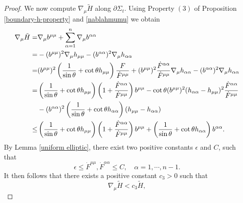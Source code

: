 \documentclass[11pt,reqno]{amsart}
\theoremstyle{definition}
\theoremstyle{remark}
\numberwithin{equation}{section}
\renewcommand{\(}{\left(}
\renewcommand{\)}{\right)}
\renewcommand{\-}{\overline}
\begin{document}
\begin{proof}
We now compute $\nabla_{\mu}\tilde{H}$ along $\partial\Sigma_t$. Using  Property $(3)$ of Proposition \ref{boundary-h-property} and \eqref{nablahmumu} we obtain
\begin{align}
	\nabla_{\mu}{\tilde{H}}=&\nabla_{\mu}{b^{\mu\mu}}+\sum_{\alpha=1}^n{\nabla_{\mu}b^{\alpha\alpha}}\notag\\
	=&-(b^{\mu\mu})^2\nabla_{\mu}{h_{\mu\mu}}-(b^{\alpha\alpha})^2\nabla_{\mu}{h_{\alpha\alpha}}\notag\\
	=&(b^{\mu\mu})^2\left(\frac{1}{\sin\theta}+\cot\theta h_{\mu\mu}\right)\frac{F}{\dot{F}^{\mu\mu}}+(b^{\mu\mu})^2\frac{\dot{F}^{\alpha\alpha}}{\dot{F}^{\mu\mu}}\nabla_{\mu}{h_{\alpha\alpha}}-(b^{\alpha\alpha})^2\nabla_{\mu}{h_{\alpha\alpha}}\nonumber\\
	=&\left(\frac{1}{\sin\theta}+\cot\theta h_{\mu\mu}\right)\left(1+\frac{\dot{F}^{\alpha\alpha}}{\dot{F}^{\mu\mu}}\right)b^{\mu\mu}-\cot\theta(b^{\mu\mu})^2(h_{\alpha\alpha}-h_{\mu\mu})^2\frac{\dot{F}^{\alpha\alpha}}{\dot{F}^{\mu\mu}}\nonumber\\
	&-(b^{\alpha\alpha})^2\left(\frac{1}{\sin\theta}+\cot\theta h_{\alpha\alpha}\right)(h_{\mu\mu}-h_{\alpha\alpha})\nonumber\\
	\leq&\left(\frac{1}{\sin\theta}+\cot\theta h_{\mu\mu}\right)\left(1+\frac{\dot{F}^{\alpha\alpha}}{\dot{F}^{\mu\mu}}\right)b^{\mu\mu}+\left(\frac{1}{\sin\theta}+\cot\theta h_{\alpha\alpha}\right)b^{\alpha\alpha}.
\end{align} 
By Lemma \ref{uniform elliptic}, there exist two positive constants $\epsilon$ and $C$, such that 
\begin{equation*}
	\epsilon\leq \dot{F}^{\mu\mu},\dot{F}^{\alpha\alpha}\leq C,\quad \alpha=1,\cdots,n-1.
\end{equation*}
It then follows that there exists a positive constant $c_3>0$ such that
\begin{equation}\label{ntH}
	\nabla_{\mu}\tilde{H}< c_3\tilde{H},
\end{equation}

\end{proof}
\end{document}
